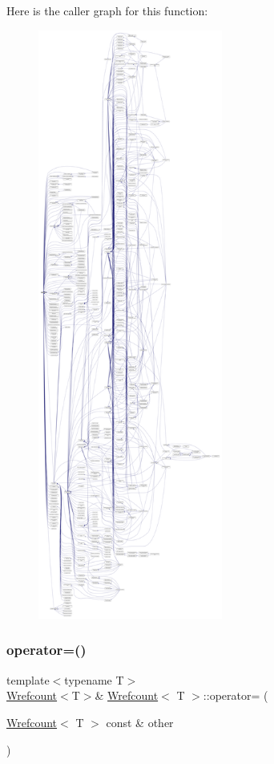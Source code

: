 Here is the caller graph for this function\+:
\nopagebreak
\begin{figure}[H]
\begin{center}
\leavevmode
\includegraphics[height=550pt]{d0/d73/classWrefcount_aeb4ad88c8369bb5d0d8da06e77146944_icgraph}
\end{center}
\end{figure}
\mbox{\label{classWrefcount_af3b3395e2a04cda87a0b4690bedccc72}} 
\subsubsection{\texorpdfstring{operator=()}{operator=()}\hspace{0.1cm}{\footnotesize\ttfamily [1/2]}}
{\footnotesize\ttfamily template$<$typename T$>$ \\
\hyperlink{classWrefcount}{Wrefcount}$<$T$>$\& \hyperlink{classWrefcount}{Wrefcount}$<$ T $>$\+::operator= (\begin{DoxyParamCaption}\item[{\hyperlink{classWrefcount}{Wrefcount}$<$ T $>$ const \&}]{other }\end{DoxyParamCaption})\hspace{0.3cm}{\ttfamily [inline]}}



